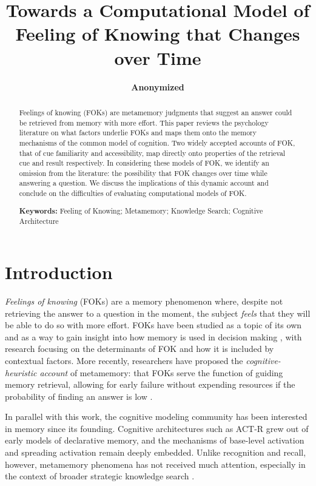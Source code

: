 \documentclass[10pt,letterpaper]{article}
\title{Towards a Computational Model of Feeling of Knowing that Changes over Time} %
\author{
    {\large \bf Anonymized}
}
\begin{document}
\maketitle

\begin{abstract}

    Feelings of knowing (FOKs) are metamemory judgments that suggest an answer could be retrieved from memory with more effort.
    This paper reviews the psychology literature on what factors underlie FOKs and maps them onto the memory mechanisms of the common model of cognition.
    Two widely accepted accounts of FOK, that of cue familiarity and accessibility, map directly onto properties of the retrieval cue and result respectively.
    In considering these models of FOK, we identify an omission from the literature: the possibility that FOK changes over time while answering a question.
    We discuss the implications of this dynamic account and conclude on the difficulties of evaluating computational models of FOK.

    \textbf{Keywords:} Feeling of Knowing; Metamemory; Knowledge Search; Cognitive Architecture

\end{abstract}


\section{Introduction}

\textit{Feelings of knowing} (FOKs) are a memory phenomenon where, despite not retrieving the answer to a question in the moment, the subject \textit{feels} that they will be able to do so with more effort.
FOKs have been studied as a topic of its own and as a way to gain insight into how memory is used in decision making \cite{Nelson1994WhyInvestigateMetacognition}, with research focusing on the determinants of FOK and how it is included by contextual factors.
More recently, researchers have proposed the \textit{cognitive-heuristic account} of metamemory: that FOKs serve the function of guiding memory retrieval, allowing for early failure without expending resources if the probability of finding an answer is low \cite{Schwartz2011TipOfThe}.

In parallel with this work, the cognitive modeling community has been interested in memory since its founding.
Cognitive architectures such as ACT-R \cite{Anderson2007HowCanThe} grew out of early models of declarative memory, and the mechanisms of base-level activation and spreading activation remain deeply embedded.
Unlike recognition and recall, however, metamemory phenomena has not received much attention, especially in the context of broader strategic knowledge search \cite{Newell1972HumanProblemSolving}.
\end{document}

